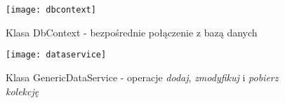 \begin{figure}[H]
	\centering
	\texttt{[image: dbcontext]}
	\caption{Klasa DbContext - bezpośrednie połączenie z bazą danych}
	\label{rys:dbcontext}
\end{figure}

\begin{figure}[H]
	\centering
	\texttt{[image: dataservice]}
	\caption{Klasa GenericDataService - operacje \textit{dodaj}, \textit{zmodyfikuj} i \textit{pobierz kolekcję}}
	\label{rys:dataservice}
\end{figure}